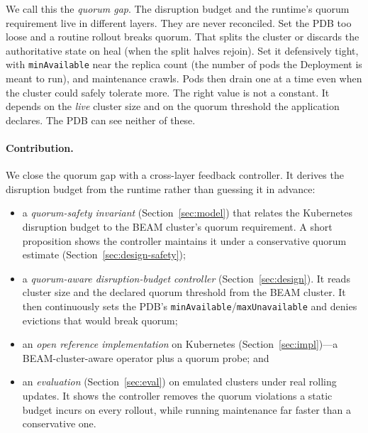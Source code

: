 \documentclass[AMA,Times1COL]{WileyNJDv5}
\begin{document}
We call this the \emph{quorum gap}. The disruption budget and the runtime's quorum requirement live in
different layers. They are never reconciled. Set the PDB too loose and a routine rollout breaks quorum.
That splits the cluster or discards the authoritative state on heal (when the split halves rejoin). Set
it defensively tight, with \texttt{minAvailable} near the replica count (the number of pods the
Deployment is meant to run), and maintenance crawls. Pods then drain one at a time even when the cluster
could safely tolerate more. The right value is not a constant. It depends on the \emph{live} cluster size
and on the quorum threshold the application declares. The PDB can see neither of these.

\paragraph{Contribution.} We close the quorum gap with a cross-layer feedback controller. It derives
the disruption budget from the runtime rather than guessing it in advance:
\begin{itemize}[nosep]
  \item a \emph{quorum-safety invariant} (Section~\ref{sec:model}) that relates the Kubernetes disruption
        budget to the BEAM cluster's quorum requirement. A short proposition shows the controller
        maintains it under a conservative quorum estimate (Section~\ref{sec:design-safety});
  \item a \emph{quorum-aware disruption-budget controller} (Section~\ref{sec:design}). It reads cluster
        size and the declared quorum threshold from the BEAM cluster. It then continuously sets the PDB's
        \texttt{minAvailable}/\texttt{maxUnavailable} and denies evictions that would break quorum;
  \item an \emph{open reference implementation} on Kubernetes (Section~\ref{sec:impl})---a
        BEAM-cluster-aware operator plus a quorum probe; and
  \item an \emph{evaluation} (Section~\ref{sec:eval}) on emulated clusters under real rolling updates. It
        shows the controller removes the quorum violations a static budget incurs on every rollout,
        while running maintenance far faster than a conservative one.
\end{itemize}
\end{document}

